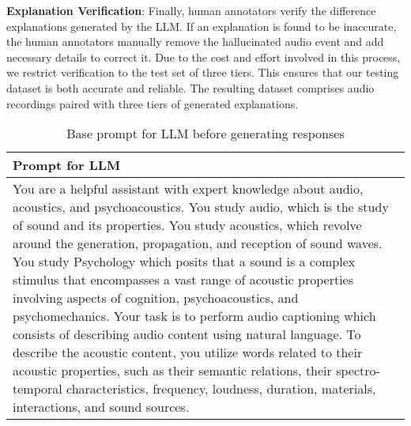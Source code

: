 \textbf{Explanation Verification}: Finally, human annotators verify the difference explanations generated by the LLM. If an explanation is found to be inaccurate, the human annotators manually remove the hallucinated audio event and add necessary details to correct it. Due to the cost and effort involved in this process, we restrict verification to the test set of three tiers. This ensures that our testing dataset is both accurate and reliable. The resulting dataset comprises audio recordings paired with three tiers of generated explanations.



\begin{table*}[t]
\centering
\scriptsize
\label{tab:open_res}
\setlength\tabcolsep{1pt}
\begin{tabular}{p{13cm}} \\ \toprule  
\textbf{Prompt for LLM} \\ \midrule
You are a helpful assistant with expert knowledge about audio, acoustics, and psychoacoustics. You study audio, which is the study of sound and its properties. You study acoustics, which revolve around the generation, propagation, and reception of sound waves. You study Psychology which posits that a sound is a complex stimulus that encompasses a vast range of acoustic properties involving aspects of cognition, psychoacoustics, and psychomechanics. Your task is to perform audio captioning which consists of describing audio content using natural language. To describe the acoustic content, you utilize words related to their acoustic properties, such as their semantic relations, their spectro-temporal characteristics, frequency, loudness, duration, materials, interactions, and sound sources.\\ \bottomrule 
\end{tabular}
\caption{\small Base prompt for LLM before generating responses} \label{table: prompt}
\end{table*}


